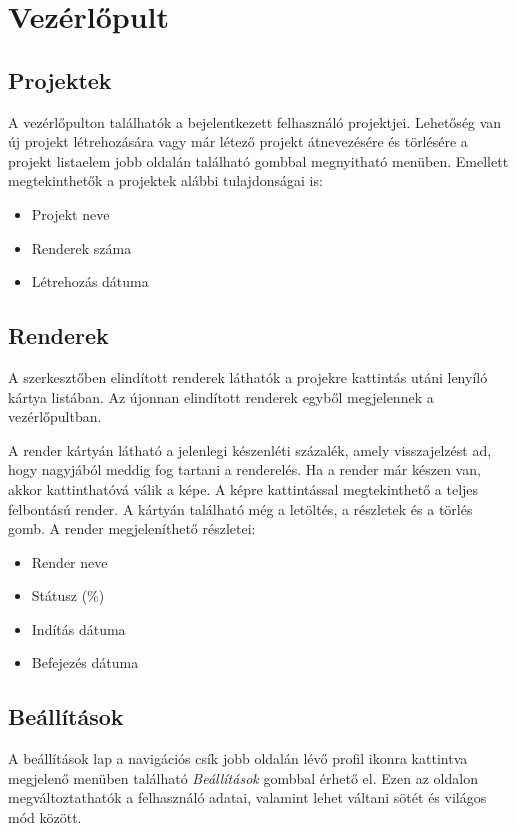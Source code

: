 \section{Vezérlőpult}


\subsection{Projektek}
A vezérlőpulton találhatók a bejelentkezett felhasználó projektjei. Lehetőség van új projekt létrehozására vagy már létező projekt átnevezésére és törlésére a projekt listaelem jobb oldalán található gombbal megnyitható menüben. Emellett megtekinthetők a projektek alábbi tulajdonságai is:
\begin{samepage}
  \begin{itemize}
    \item Projekt neve
    \item Renderek száma
    \item Létrehozás dátuma
  \end{itemize}
\end{samepage}

\subsection{Renderek}
A szerkesztőben elindított renderek láthatók a projekre kattintás utáni lenyíló kártya listában. Az újonnan elindított renderek egyből megjelennek a vezérlőpultban.

A render kártyán látható a jelenlegi készenléti százalék, amely visszajelzést ad, hogy nagyjából meddig fog tartani a renderelés. Ha a render már készen van, akkor kattinthatóvá válik a képe. A képre kattintással megtekinthető a teljes felbontású render. A kártyán található még a letöltés, a részletek és a törlés gomb. A render megjeleníthető részletei:
\begin{samepage}
  \begin{itemize}
    \item Render neve
    \item Státusz (\%)
    \item Indítás dátuma
    \item Befejezés dátuma
  \end{itemize}
\end{samepage}

\subsection{Beállítások}
A beállítások lap a navigációs csík jobb oldalán lévő profil ikonra kattintva megjelenő menüben található \emph{Beállítások} gombbal érhető el. Ezen az oldalon megváltoztathatók a felhasználó adatai, valamint lehet váltani sötét és világos mód között.
